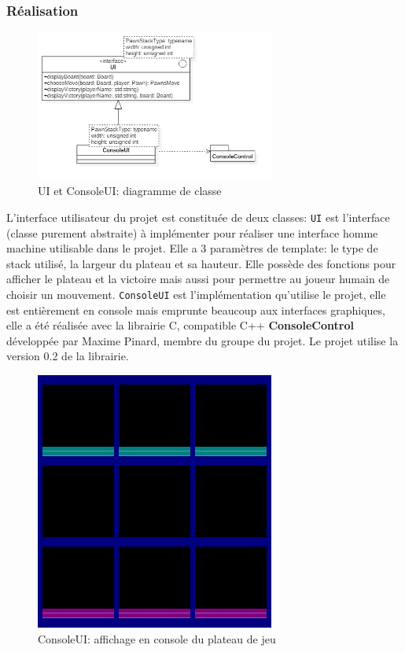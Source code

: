 \documentclass[article, backcover, french, nodocumentinfo]{upmethodology-document}
\begin{document}
			\subsubsection{Réalisation}
				\begin{figure}[H]
					\centering
					\includegraphics[width=0.7\textwidth]{figures/UIDiagram}
					\caption{UI et ConsoleUI: diagramme de classe}
					\label{fig:UIDiagram}
				\end{figure}
				L'interface utilisateur du projet est constituée de deux classes:
					\texttt{UI} est l'interface (classe purement abstraite) à implémenter pour réaliser une interface homme machine utilisable dans le projet. Elle a 3 paramètres de template: le type de stack utilisé, la largeur du plateau et sa hauteur. Elle possède des fonctions pour afficher le plateau et la victoire mais aussi pour permettre au joueur humain de choisir un mouvement.
					\texttt{ConsoleUI} est l'implémentation qu'utilise le projet, elle est entièrement en console mais emprunte beaucoup aux interfaces graphiques, elle a été réalisée avec la librairie C, compatible C++ \textbf{ConsoleControl} développée par Maxime Pinard, membre du groupe du projet. Le projet utilise la version 0.2 de la librairie.
					\begin{figure}[H]
						\centering
						\includegraphics[width=0.7\textwidth]{figures/ConsoleUI}
						\caption{ConsoleUI: affichage en console du plateau de jeu}
						\label{fig:ConsoleUI}
					\end{figure}
\end{document}

